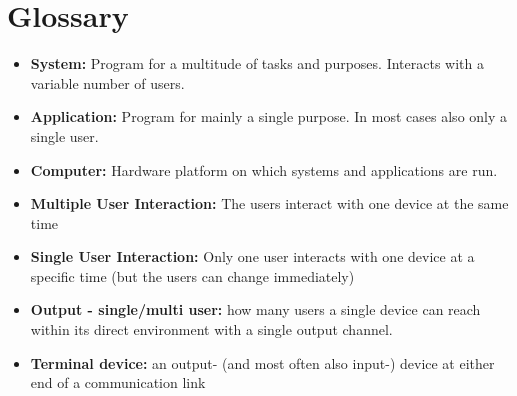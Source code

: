 \documentclass{acm_proc_article-sp}
\begin{document}
\section{Glossary}

\begin{itemize}
\item \textbf{System:} Program for a multitude of tasks and purposes. Interacts with a variable number of users.
\item \textbf{Application:} Program for mainly a single purpose. In most cases also only a single user.
\item \textbf{Computer:} Hardware platform on which systems and applications are run.
\item \textbf{Multiple User Interaction:} The users interact with one device at the same time 
\item \textbf{Single User Interaction:} Only one user interacts with one device  at a specific time (but the users can change immediately)
\item \textbf{Output - single/multi user:} how many users a single device can reach within its direct environment with a single output channel.
\item \textbf{Terminal device:} an output- (and most often also input-) device at either end of a communication link
\end{itemize}

\balancecolumns
\end{document}
